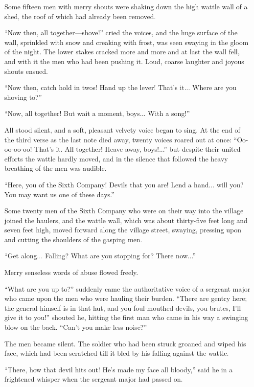 Some fifteen men with merry shouts were shaking down the high
wattle wall of a shed, the roof of which had already been
removed.

``Now then, all together---shove!'' cried the voices, and the
huge surface of the wall, sprinkled with snow and creaking with
frost, was seen swaying in the gloom of the night. The lower
stakes cracked more and more and at last the wall fell, and with
it the men who had been pushing it. Loud, coarse laughter and
joyous shouts ensued.

``Now then, catch hold in twos! Hand up the lever! That's
it... Where are you shoving to?''

``Now, all together! But wait a moment, boys... With a song!''

All stood silent, and a soft, pleasant velvety voice began to
sing. At the end of the third verse as the last note died away,
twenty voices roared out at once: ``Oo-oo-oo-oo! That's it. All
together! Heave away, boys!...'' but despite their united efforts
the wattle hardly moved, and in the silence that followed the
heavy breathing of the men was audible.

``Here, you of the Sixth Company! Devils that you are! Lend a
hand...  will you? You may want us one of these days.''

Some twenty men of the Sixth Company who were on their way into
the village joined the haulers, and the wattle wall, which was
about thirty-five feet long and seven feet high, moved forward
along the village street, swaying, pressing upon and cutting the
shoulders of the gasping men.

``Get along... Falling? What are you stopping for? There now...''

Merry senseless words of abuse flowed freely.

``What are you up to?'' suddenly came the authoritative voice of
a sergeant major who came upon the men who were hauling their
burden.  ``There are gentry here; the general himself is in that
hut, and you foul-mouthed devils, you brutes, I'll give it to
you!'' shouted he, hitting the first man who came in his way a
swinging blow on the back.  ``Can't you make less noise?''

The men became silent. The soldier who had been struck groaned
and wiped his face, which had been scratched till it bled by his
falling against the wattle.

``There, how that devil hits out! He's made my face all bloody,''
said he in a frightened whisper when the sergeant major had
passed on.

